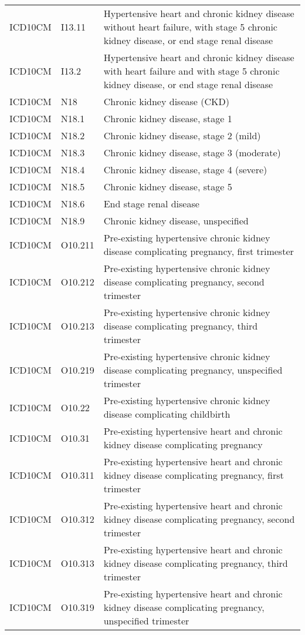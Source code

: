 \begin{longtable}{p{}p{}p{}}
  ICD10CM & I13.11 & Hypertensive heart and chronic kidney disease without heart failure, with stage 5 chronic kidney disease, or end stage renal disease \\ 
  ICD10CM & I13.2 & Hypertensive heart and chronic kidney disease with heart failure and with stage 5 chronic kidney disease, or end stage renal disease \\ 
  ICD10CM & N18 & Chronic kidney disease (CKD) \\ 
  ICD10CM & N18.1 & Chronic kidney disease, stage 1 \\ 
  ICD10CM & N18.2 & Chronic kidney disease, stage 2 (mild) \\ 
  ICD10CM & N18.3 & Chronic kidney disease, stage 3 (moderate) \\ 
  ICD10CM & N18.4 & Chronic kidney disease, stage 4 (severe) \\ 
  ICD10CM & N18.5 & Chronic kidney disease, stage 5 \\ 
  ICD10CM & N18.6 & End stage renal disease \\ 
  ICD10CM & N18.9 & Chronic kidney disease, unspecified \\ 
  ICD10CM & O10.211 & Pre-existing hypertensive chronic kidney disease complicating pregnancy, first trimester \\ 
  ICD10CM & O10.212 & Pre-existing hypertensive chronic kidney disease complicating pregnancy, second trimester \\ 
  ICD10CM & O10.213 & Pre-existing hypertensive chronic kidney disease complicating pregnancy, third trimester \\ 
  ICD10CM & O10.219 & Pre-existing hypertensive chronic kidney disease complicating pregnancy, unspecified trimester \\ 
  ICD10CM & O10.22 & Pre-existing hypertensive chronic kidney disease complicating childbirth \\ 
  ICD10CM & O10.31 & Pre-existing hypertensive heart and chronic kidney disease complicating pregnancy \\ 
  ICD10CM & O10.311 & Pre-existing hypertensive heart and chronic kidney disease complicating pregnancy, first trimester \\ 
  ICD10CM & O10.312 & Pre-existing hypertensive heart and chronic kidney disease complicating pregnancy, second trimester \\ 
  ICD10CM & O10.313 & Pre-existing hypertensive heart and chronic kidney disease complicating pregnancy, third trimester \\ 
  ICD10CM & O10.319 & Pre-existing hypertensive heart and chronic kidney disease complicating pregnancy, unspecified trimester \\ 

\end{longtable}
